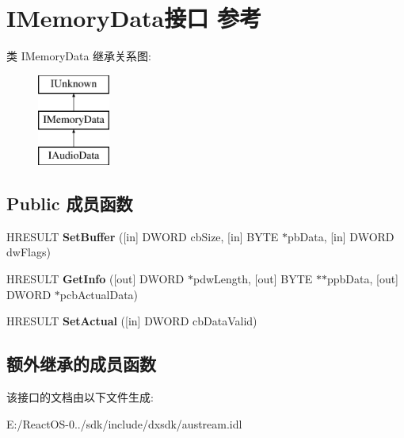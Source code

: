 \hypertarget{interface_i_memory_data}{}\section{I\+Memory\+Data接口 参考}
\label{interface_i_memory_data}
类 I\+Memory\+Data 继承关系图\+:\begin{figure}[H]
\begin{center}
\leavevmode
\includegraphics[height=3.000000cm]{interface_i_memory_data}
\end{center}
\end{figure}
\subsection*{Public 成员函数}
\begin{DoxyCompactItemize}
\item 
\mbox{\label{interface_i_memory_data_a133b71bc4890c2770bdba458e86e00f4}} 
H\+R\+E\+S\+U\+LT {\bfseries Set\+Buffer} (\mbox{[}in\mbox{]} D\+W\+O\+RD cb\+Size, \mbox{[}in\mbox{]} B\+Y\+TE $\ast$pb\+Data, \mbox{[}in\mbox{]} D\+W\+O\+RD dw\+Flags)
\item 
\mbox{\label{interface_i_memory_data_a048f4112a22067a63e7758f4f94deca7}} 
H\+R\+E\+S\+U\+LT {\bfseries Get\+Info} (\mbox{[}out\mbox{]} D\+W\+O\+RD $\ast$pdw\+Length, \mbox{[}out\mbox{]} B\+Y\+TE $\ast$$\ast$ppb\+Data, \mbox{[}out\mbox{]} D\+W\+O\+RD $\ast$pcb\+Actual\+Data)
\item 
\mbox{\label{interface_i_memory_data_a17c337a91c8a42519cebcc68450d1167}} 
H\+R\+E\+S\+U\+LT {\bfseries Set\+Actual} (\mbox{[}in\mbox{]} D\+W\+O\+RD cb\+Data\+Valid)
\end{DoxyCompactItemize}
\subsection*{额外继承的成员函数}


该接口的文档由以下文件生成\+:\begin{DoxyCompactItemize}
\item 
E\+:/\+React\+O\+S-\/0../sdk/include/dxsdk/austream.\+idl\end{DoxyCompactItemize}
